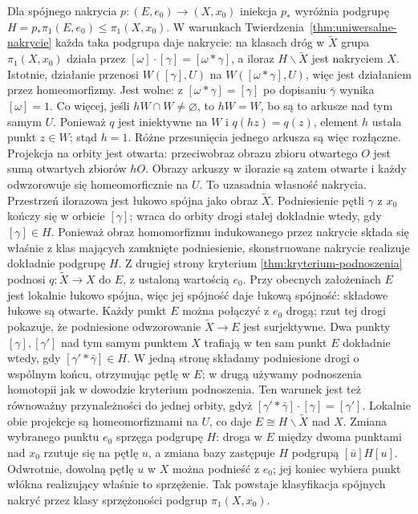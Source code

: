 \begin{uwaga}
\label{uwaga:nakrycia-podgrupy}
Dla spójnego nakrycia $p:(E,e_0)\to(X,x_0)$
iniekcja $p_*$ wyróżnia podgrupę
$H=p_*\pi_1(E,e_0)\leq\pi_1(X,x_0)$.
W warunkach Twierdzenia~\ref{thm:uniwersalne-nakrycie}
każda taka podgrupa daje nakrycie:
na klasach dróg w $\widetilde X$ grupa
$\pi_1(X,x_0)$ działa przez
$[\omega]\cdot[\gamma]=[\omega*\gamma]$,
a iloraz $H\backslash\widetilde X$
jest nakryciem $X$. Istotnie, działanie przenosi
$W([\gamma],U)$ na $W([\omega*\gamma],U)$,
więc jest działaniem przez homeomorfizmy. Jest wolne:
z $[\omega*\gamma]=[\gamma]$ po dopisaniu $\bar\gamma$
wynika $[\omega]=1$.
Co więcej, jeśli $hW\cap W\ne\varnothing$, to $hW=W$,
bo są to arkusze nad tym samym $U$. Ponieważ $q$ jest
iniektywne na $W$ i $q(hz)=q(z)$, element $h$ ustala punkt $z\in W$;
stąd $h=1$. Różne przesunięcia jednego arkusza są więc rozłączne.
Projekcja na orbity jest otwarta: przeciwobraz obrazu zbioru
otwartego $O$ jest sumą otwartych zbiorów $hO$.
Obrazy arkuszy w ilorazie są zatem otwarte i każdy odwzorowuje się
homeomorficznie na $U$. To uzasadnia własność nakrycia.
Przestrzeń ilorazowa jest łukowo spójna jako obraz $\widetilde X$.
Podniesienie pętli $\gamma$ z $x_0$ kończy się w orbicie $[\gamma]$;
wraca do orbity drogi stałej dokładnie wtedy, gdy $[\gamma]\in H$.
Ponieważ obraz homomorfizmu indukowanego przez nakrycie składa się
właśnie z klas mających zamknięte podniesienie, skonstruowane nakrycie
realizuje dokładnie podgrupę $H$.
Z drugiej strony kryterium
\ref{thm:kryterium-podnoszenia} podnosi
$q:\widetilde X\to X$ do $E$, z ustaloną wartością $e_0$.
Przy obecnych założeniach $E$ jest lokalnie łukowo spójna,
więc jej spójność daje łukową spójność: składowe łukowe są otwarte.
Każdy punkt $E$ można połączyć z $e_0$ drogą; rzut tej drogi
pokazuje, że podniesione odwzorowanie $\widetilde X\to E$ jest surjektywne.
Dwa punkty $[\gamma],[\gamma']$ nad tym samym punktem $X$
trafiają w ten sam punkt $E$
dokładnie wtedy, gdy $[\gamma'*\bar\gamma]\in H$.
W jedną stronę składamy podniesione drogi o wspólnym końcu,
otrzymując pętlę w $E$; w drugą używamy podnoszenia homotopii
jak w dowodzie kryterium podnoszenia. Ten warunek jest też
równoważny przynależności do jednej orbity, gdyż
$[\gamma'*\bar\gamma]\cdot[\gamma]=[\gamma']$.
Lokalnie obie projekcje są
homeomorfizmami na $U$, co daje
$E\cong H\backslash\widetilde X$
nad $X$. Zmiana wybranego punktu
$e_0$ sprzęga podgrupę $H$: droga w $E$ między dwoma punktami
nad $x_0$ rzutuje się na pętlę $u$, a zmiana bazy zastępuje
$H$ podgrupą $[\bar u]H[u]$.
Odwrotnie, dowolną pętlę $u$ w $X$ można podnieść z $e_0$;
jej koniec wybiera punkt włókna realizujący właśnie to sprzężenie.
Tak powstaje klasyfikacja spójnych
nakryć przez klasy sprzężoności
podgrup $\pi_1(X,x_0)$.
\end{uwaga}

